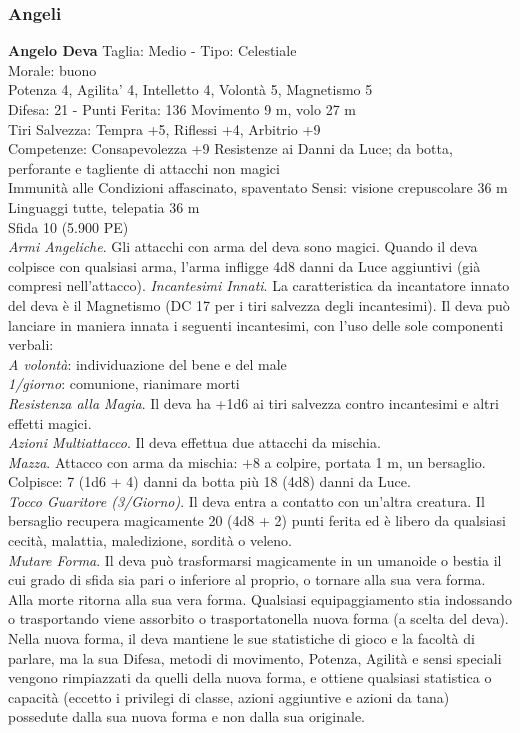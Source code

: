 \begin{multicols}{2}
\subsubsection{Angeli}
\medskip\textbf{Angelo Deva}
Taglia: Medio  - Tipo: Celestiale\\
Morale: buono\\
Potenza 4, Agilita' 4, Intelletto 4, Volontà 5, Magnetismo 5\\
Difesa: 21 - Punti Ferita: 136
Movimento 9 m, volo 27 m\\
Tiri Salvezza: Tempra +5, Riflessi +4, Arbitrio +9\\
Competenze: Consapevolezza +9
Resistenze ai Danni da Luce; da botta, perforante e tagliente di attacchi non magici\\
Immunità alle Condizioni affascinato, spaventato
Sensi: visione crepuscolare 36 m\\
Linguaggi tutte, telepatia 36 m\\
Sfida 10 (5.900 PE)\\
\textit{Armi Angeliche}. Gli attacchi con arma del deva sono magici. Quando il deva colpisce con qualsiasi arma, l’arma infligge 4d8 danni da Luce aggiuntivi (già compresi nell’attacco).
\textit{Incantesimi Innati}. La caratteristica da incantatore innato del deva è il Magnetismo (DC 17 per i tiri salvezza degli incantesimi). Il deva può lanciare in maniera innata i seguenti incantesimi, con l’uso delle sole componenti verbali:\\
\textit{A volontà}: individuazione del bene e del male\\
\textit{1/giorno}: comunione, rianimare morti\\
\textit{Resistenza alla Magia}. Il deva ha +1d6 ai tiri salvezza contro incantesimi e altri effetti magici.\\
\textit{Azioni Multiattacco}. Il deva effettua due attacchi da mischia.\\
\textit{Mazza}. Attacco con arma da mischia: +8 a colpire, portata 1 m, un bersaglio.
Colpisce: 7 (1d6 + 4) danni da botta più 18 (4d8) danni da Luce. \\
\textit{Tocco Guaritore (3/Giorno)}. Il deva entra a contatto con un’altra creatura. Il bersaglio recupera magicamente 20 (4d8 + 2) punti ferita ed è libero da qualsiasi cecità, malattia, maledizione, sordità o veleno.\\
\textit{Mutare Forma}. Il deva può trasformarsi magicamente in un umanoide o bestia il cui grado di sfida sia pari o inferiore al proprio, o tornare alla sua vera forma. Alla morte ritorna alla sua vera forma. Qualsiasi equipaggiamento stia indossando o trasportando viene assorbito o trasportatonella nuova forma (a scelta del deva).  Nella nuova forma, il deva mantiene le sue statistiche di gioco e la facoltà di parlare, ma la sua Difesa, metodi di movimento, Potenza,
Agilità e sensi speciali vengono rimpiazzati da quelli della nuova forma, e ottiene qualsiasi statistica o capacità (eccetto i privilegi di classe, azioni aggiuntive e azioni da tana) possedute dalla sua nuova forma e non dalla sua originale.


\end{multicols}
